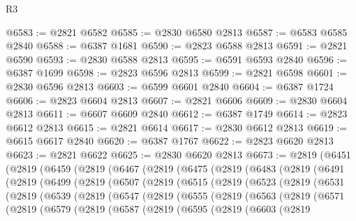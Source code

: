 \begin{lexlean}{R3}
\begin{coremodule}
@6583 := @2821 @6582
@6585 := @2830 @6580 @2813
@6587 := @6583 @6585 @2840
@6588 := @6387 @1681
@6590 := @2823 @6588 @2813
@6591 := @2821 @6590
@6593 := @2830 @6588 @2813
@6595 := @6591 @6593 @2840
@6596 := @6387 @1699
@6598 := @2823 @6596 @2813
@6599 := @2821 @6598
@6601 := @2830 @6596 @2813
@6603 := @6599 @6601 @2840
@6604 := @6387 @1724
@6606 := @2823 @6604 @2813
@6607 := @2821 @6606
@6609 := @2830 @6604 @2813
@6611 := @6607 @6609 @2840
@6612 := @6387 @1749
@6614 := @2823 @6612 @2813
@6615 := @2821 @6614
@6617 := @2830 @6612 @2813
@6619 := @6615 @6617 @2840
@6620 := @6387 @1767
@6622 := @2823 @6620 @2813
@6623 := @2821 @6622
@6625 := @2830 @6620 @2813
@6673 := @2819
    (@6451
      (@2819
        (@6459
          (@2819
            (@6467
              (@2819
                (@6475
                  (@2819
                    (@6483
                      (@2819
                        (@6491
                          (@2819
                            (@6499
                              (@2819
                                (@6507
                                  (@2819
                                    (@6515
                                      (@2819
                                        (@6523
                                          (@2819
                                            (@6531
                                              (@2819
                                                (@6539
                                                  (@2819
                                                    (@6547
                                                      (@2819
                                                        (@6555
                                                          (@2819
                                                            (@6563
                                                              (@2819
                                                                (@6571
                                                                  (@2819
                                                                    (@6579
                                                                      (@2819
                                                                        (@6587
                                                                          (@2819
                                                                            (@6595
                                                                              (@2819
                                                                                (@6603
                                                                                  (@2819

\end{coremodule}
\end{lexlean}
